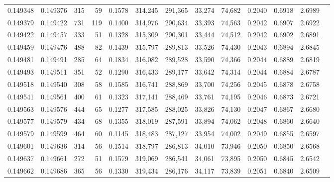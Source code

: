\begin{tabular}{rrrrrrrrrrrrr}
0.149348 & 0.149376 &   315 &  59 &                                     0.1578 & 314,245 & 291,365 &  33,274 &  74,682 & 0.2040 & 0.6918 & 2.6989 \\
0.149379 & 0.149422 &   731 & 119 &                                     0.1400 & 314,976 & 290,634 &  33,393 &  74,563 & 0.2042 & 0.6907 & 2.6922 \\
0.149422 & 0.149457 &   333 &  51 &                                     0.1328 & 315,309 & 290,301 &  33,444 &  74,512 & 0.2042 & 0.6902 & 2.6891 \\
0.149459 & 0.149476 &   488 &  82 &                                     0.1439 & 315,797 & 289,813 &  33,526 &  74,430 & 0.2043 & 0.6894 & 2.6845 \\
0.149481 & 0.149491 &   285 &  64 &                                     0.1834 & 316,082 & 289,528 &  33,590 &  74,366 & 0.2044 & 0.6889 & 2.6819 \\
0.149493 & 0.149511 &   351 &  52 &                                     0.1290 & 316,433 & 289,177 &  33,642 &  74,314 & 0.2044 & 0.6884 & 2.6787 \\
0.149518 & 0.149540 &   308 &  58 &                                     0.1585 & 316,741 & 288,869 &  33,700 &  74,256 & 0.2045 & 0.6878 & 2.6758 \\
0.149541 & 0.149561 &   400 &  61 &                                     0.1323 & 317,141 & 288,469 &  33,761 &  74,195 & 0.2046 & 0.6873 & 2.6721 \\
0.149563 & 0.149576 &   444 &  65 &                                     0.1277 & 317,585 & 288,025 &  33,826 &  74,130 & 0.2047 & 0.6867 & 2.6680 \\
0.149577 & 0.149579 &   434 &  68 &                                     0.1355 & 318,019 & 287,591 &  33,894 &  74,062 & 0.2048 & 0.6860 & 2.6640 \\
0.149579 & 0.149599 &   464 &  60 &                                     0.1145 & 318,483 & 287,127 &  33,954 &  74,002 & 0.2049 & 0.6855 & 2.6597 \\
0.149601 & 0.149636 &   314 &  56 &                                     0.1514 & 318,797 & 286,813 &  34,010 &  73,946 & 0.2050 & 0.6850 & 2.6568 \\
0.149637 & 0.149661 &   272 &  51 &                                     0.1579 & 319,069 & 286,541 &  34,061 &  73,895 & 0.2050 & 0.6845 & 2.6542 \\
0.149662 & 0.149686 &   365 &  56 &                                     0.1330 & 319,434 & 286,176 &  34,117 &  73,839 & 0.2051 & 0.6840 & 2.6509 \\

\end{tabular}
